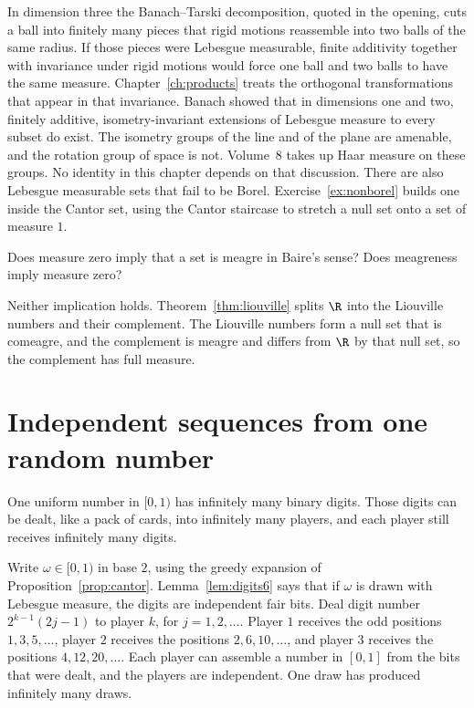 In dimension three the Banach--Tarski decomposition, quoted in the opening, cuts a ball into finitely many pieces that rigid motions reassemble into two balls of the same radius.
If those pieces were Lebesgue measurable, finite additivity together with invariance under rigid motions would force one ball and two balls to have the same measure.
Chapter~\ref{ch:products} treats the orthogonal transformations that appear in that invariance.
Banach showed that in dimensions one and two, finitely additive, isometry-invariant extensions of Lebesgue measure to every subset do exist.
The isometry groups of the line and of the plane are amenable, and the rotation group of space is not.
Volume~8 takes up Haar measure on these groups.
No identity in this chapter depends on that discussion.
There are also Lebesgue measurable sets that fail to be Borel.
Exercise~\ref{ex:nonborel} builds one inside the Cantor set, using the Cantor staircase to stretch a null set onto a set of measure $1$.

\begin{think}
Does measure zero imply that a set is meagre in Baire's sense?
Does meagreness imply measure zero?
\end{think}

Neither implication holds.
Theorem~\ref{thm:liouville} splits $\R$ into the Liouville numbers and their complement.
The Liouville numbers form a null set that is comeagre, and the complement is meagre and differs from $\R$ by that null set, so the complement has full measure.

\section{Independent sequences from one random number}

One uniform number in $[0,1)$ has infinitely many binary digits.
Those digits can be dealt, like a pack of cards, into infinitely many players, and each player still receives infinitely many digits.

Write $\omega\in[0,1)$ in base $2$, using the greedy expansion of Proposition~\ref{prop:cantor}.
Lemma~\ref{lem:digits6} says that if $\omega$ is drawn with Lebesgue measure, the digits are independent fair bits.
Deal digit number $2^{k-1}(2j-1)$ to player $k$, for $j=1,2,\ldots$.
Player $1$ receives the odd positions $1,3,5,\ldots$, player $2$ receives the positions $2,6,10,\ldots$, and player $3$ receives the positions $4,12,20,\ldots$.
Each player can assemble a number in $[0,1]$ from the bits that were dealt, and the players are independent.
One draw has produced infinitely many draws.

